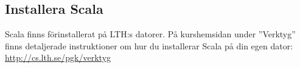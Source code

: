 \subsection{Installera Scala}

Scala finns förinstallerat på LTH:s datorer. På kurshemsidan under ''Verktyg'' finns detaljerade instruktioner om hur du installerar Scala på din egen dator:  \\ \url{http://cs.lth.se/pgk/verktyg}

%
%
%
%



